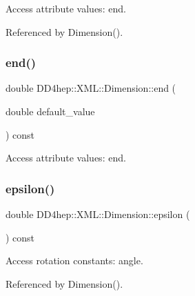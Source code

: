 Access attribute values\+: end. 



Referenced by Dimension().

\hypertarget{struct_d_d4hep_1_1_x_m_l_1_1_dimension_aa649c0c505f10cbf51e2b0d7c24fe9fe}{}\label{struct_d_d4hep_1_1_x_m_l_1_1_dimension_aa649c0c505f10cbf51e2b0d7c24fe9fe} 
\subsubsection{\texorpdfstring{end()}{end()}\hspace{0.1cm}{\footnotesize\ttfamily [2/2]}}
{\footnotesize\ttfamily double D\+D4hep\+::\+X\+M\+L\+::\+Dimension\+::end (\begin{DoxyParamCaption}\item[{double}]{default\+\_\+value }\end{DoxyParamCaption}) const}



Access attribute values\+: end. 

\hypertarget{struct_d_d4hep_1_1_x_m_l_1_1_dimension_aa607599ddbefe41c499f243ff0a5c38d}{}\label{struct_d_d4hep_1_1_x_m_l_1_1_dimension_aa607599ddbefe41c499f243ff0a5c38d} 
\subsubsection{\texorpdfstring{epsilon()}{epsilon()}\hspace{0.1cm}{\footnotesize\ttfamily [1/2]}}
{\footnotesize\ttfamily double D\+D4hep\+::\+X\+M\+L\+::\+Dimension\+::epsilon (\begin{DoxyParamCaption}{ }\end{DoxyParamCaption}) const}



Access rotation constants\+: angle. 



Referenced by Dimension().

\hypertarget{struct_d_d4hep_1_1_x_m_l_1_1_dimension_a7e50224f557798a4aab0fb05ce4bb8b7}{}\label{struct_d_d4hep_1_1_x_m_l_1_1_dimension_a7e50224f557798a4aab0fb05ce4bb8b7} 
